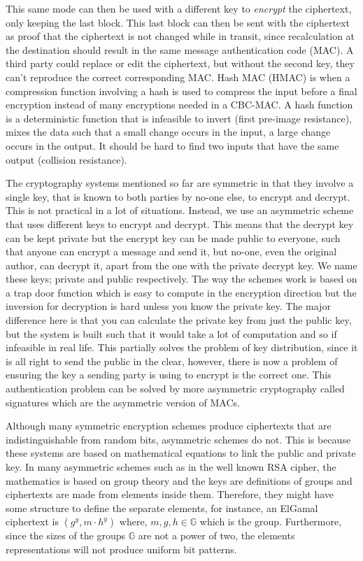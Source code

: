 \documentclass[ %
                    author={Samuel Russell},
                supervisor={Prof. Bogdan Warinschi},
                    degree={MEng},
                     title={Innocuous Ciphertexts},
                  subtitle={The DE-CENSOR Scheme},
                      type={Research},
                      year={2018} ]{dissertation}
\begin{document}
This same mode can then be used with a different key to \textit{encrypt} the ciphertext, only keeping the last block. This last block can then be sent with the ciphertext as proof that the ciphertext is not changed while in transit, since recalculation at the destination should result in the same message authentication code (MAC).
A third party could replace or edit the ciphertext, but without the second key, they can't reproduce the correct corresponding MAC.
Hash MAC (HMAC) is when a compression function involving a hash is used to compress the input before a final encryption instead of many encryptions needed in a CBC-MAC.
A hash function is a deterministic function that is infeasible to invert (first pre-image resistance), mixes the data such that a small change occurs in the input, a large change occurs in the output.
It should be hard to find two inputs that have the same output (collision resistance).

The cryptography systems mentioned so far are symmetric in that they involve a single key, that is known to both parties by no-one else, to encrypt and decrypt.
This is not practical in a lot of situations.
Instead, we use an asymmetric scheme that uses different keys to encrypt and decrypt.
This means that the decrypt key can be kept private but the encrypt key can be made public to everyone, such that anyone can encrypt a message and send it, but no-one, even the original author, can decrypt it, apart from the one with the private decrypt key.
We name these keys; private and public respectively.
The way the schemes work is based on a trap door function which is easy to compute in the encryption direction but the inversion for decryption is hard unless you know the private key.
The major difference here is that you can calculate the private key from just the public key, but the system is built such that it would take a lot of computation and so if infeasible in real life.
This partially solves the problem of key distribution, since it is all right to send the public in the clear, however, there is now a problem of ensuring the key a sending party is using to encrypt is the correct one.
This authentication problem can be solved by more asymmetric cryptography called signatures which are the asymmetric version of MACs.

Although many symmetric encryption schemes produce ciphertexts that are indistinguishable from random bits, asymmetric schemes do not.
This is because these systems are based on mathematical equations to link the public and private key.
In many asymmetric schemes such as in the well known RSA cipher, the mathematics is based on group theory and the keys are definitions of groups and ciphertexts are made from elements inside them.
Therefore, they might have some structure to define the separate elements, for instance, an ElGamal ciphertext is $(g^y, m \cdot h^y )$ where, $m,g,h \in \mathbb{G}$ which is the group.
Furthermore, since the sizes of the groups $\mathbb{G}$ are not a power of two, the elements representations will not produce uniform bit patterns.
\end{document}
